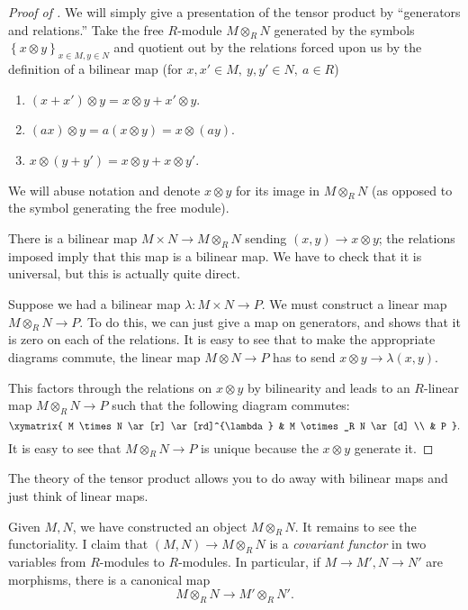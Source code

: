 \begin{proof}[Proof of ] We will simply give
a presentation of the tensor product by
``generators and relations.''
Take the free $R$-module $M \otimes_R N$ generated by the symbols $\left\{x
\otimes
y\right\}_{x \in M, y \in N}$ and quotient out by the relations forced upon us
by the definition of a bilinear map (for $x, x' \in M, \  y, y' \in N, \   a
\in R$)
\begin{enumerate}
\item  $(x+x') \otimes y = x \otimes y + x' \otimes y$.
\item $(ax) \otimes y = a(x \otimes y) = x \otimes (ay)$.
\item  $x \otimes (y+y') = x \otimes y + x \otimes y'$.
\end{enumerate}

We will abuse notation and denote $x \otimes y$ for its image in $M \otimes_R
N$ (as opposed to the symbol generating the free module).

There is a bilinear map $M \times N \to M \otimes_R N$ sending $(x,y) \to x
\otimes y$; the relations imposed imply  that this map is a bilinear map. We
have to check
that it is universal, but this is actually quite direct.

Suppose we had a bilinear map $\lambda: M \times N \to P$.  We must construct
a linear map $M
\otimes_R N \to P$.
To do this, we can just give a map on generators, and shows that it is zero on
each of the relations.
It is easy to see that to make the appropriate diagrams commute, the linear
map $M \otimes N \to P$ has to send $x \otimes y \to \lambda(x,y)$.

This factors
through the relations on $x \otimes y$ by bilinearity and leads to an
$R$-linear map $M \otimes_{R} N \to P$ such that the following diagram
commutes:
\[
\xymatrix{
M \times N \ar[r] \ar[rd]^{\lambda} &  M \otimes_R N \ar[d] \\
& P
}.\]
It is easy to see that $M \otimes_R N \to P$ is unique because the $x \otimes
y$ generate it.
\end{proof}


The theory of the tensor product allows you to do away with bilinear maps and
just think of linear maps.

Given $M, N$, we have constructed an object $M \otimes_R N$. It remains to see
the functoriality. I claim that $(M,N) \to M \otimes_R N$ is a \emph{covariant
functor} in two variables from $R$-modules to $R$-modules.
In particular, if $M \to M', N \to N'$ are morphisms, there is a canonical map
\[ M \otimes_R N \to M' \otimes_R N'.  \]


